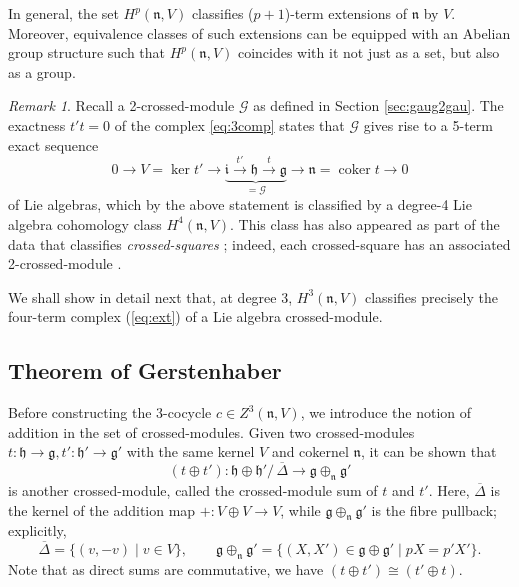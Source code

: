 \documentclass[onecolumn]{article}
\theoremstyle{theorem}
\theoremstyle{remark}
\newtheorem{remark}{Remark}[section]
\theoremstyle{example}
\theoremstyle{definition}
\numberwithin{equation}{section}
\def\g{\mathfrak g}
\def\h{\mathfrak h}
\begin{document}
{In} %
 general, the set $H^p(\mathfrak{n},V)$ classifies ($p+1$)-term extensions of $\mathfrak{n}$ by $V$. Moreover, equivalence classes of such extensions can be equipped with an Abelian group structure such that $H^p(\mathfrak{n},V)$ coincides with it not just as a set, but also as a group.

\begin{remark}\label{deg4class}
Recall a 2-crossed-module $\mathscr{G}$ as defined in Section \ref{sec:gaug2gau}. The exactness $t't=0$ of the complex  \eqref{eq:3comp} states that $\mathscr{G}$ gives rise to a 5-term exact sequence
\begin{equation}
    0\rightarrow V=\operatorname{ker}t'\rightarrow\underbrace{ \mathfrak{i}\xrightarrow{t'}\h\xrightarrow{t}\g}_{=\mathscr{G}}\rightarrow\mathfrak{n}=\operatorname{coker}t\rightarrow 0\nonumber
\end{equation}
of Lie algebras, which by the above statement is classified by a degree-4 Lie algebra cohomology class $H^4(\mathfrak{n},V)$. This class has also appeared as part of the data that classifies {\it crossed-squares} \cite{Brown}; indeed, each crossed-square has an associated 2-crossed-module \cite{Ang2018}.
\end{remark}

We shall show in detail next that, at degree 3, $H^3(\mathfrak{n},V)$ classifies precisely the four-term complex  (\ref{eq:ext}) of a Lie algebra crossed-module.


\subsection{Theorem of Gerstenhaber}
Before constructing the 3-cocycle $c\in Z^3(\mathfrak{n},V)$, we introduce the notion of addition in the set of crossed-modules. Given two crossed-modules $t:\mathfrak{h}\rightarrow\mathfrak{g},t':\mathfrak{h}'\rightarrow\mathfrak{g}'$ with the same kernel $V$ and cokernel $\mathfrak{n}$, it can be shown that
\begin{equation}
    (t\oplus t'): \mathfrak{h}\oplus\mathfrak{h}'/\, \overline\Delta\rightarrow \mathfrak{g}\oplus_\mathfrak{n}\mathfrak{g}'\nonumber
\end{equation}
is another crossed-module, called the { {crossed-module sum}} of $t$ and $t'$. Here, $\overline\Delta$ is the kernel of the addition map $+:V\oplus V\rightarrow V$, while $\mathfrak{g}\oplus_\mathfrak{n}\mathfrak{g}'$ is the fibre pullback; explicitly, $$\overline\Delta = \{(v,-v)\mid v\in V\},\qquad \mathfrak{g}\oplus_\mathfrak{n}\mathfrak{g}' = \{(X,X')\in\mathfrak{g}\oplus\mathfrak{g}'\mid pX=p'X'\}.$$ 
{Note} that as direct sums are commutative, we have $(t\oplus t') \cong (t'\oplus t)$.
\end{document}

